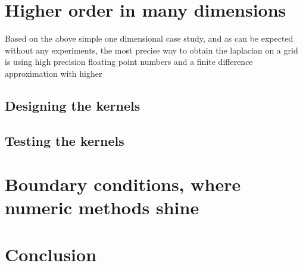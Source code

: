 \documentclass[pdftex,12pt,a4paper]{article}
\begin{document}
	\section{Higher order in many dimensions}
		Based on the above simple one dimensional case study, and as can be expected without any experiments, the most precise way to obtain the laplacian on a grid is using high precision floating point numbers and a finite difference approximation with higher 
	\subsection{Designing the kernels}
		
	\subsection{Testing the kernels}
		
	\section{Boundary conditions, where numeric methods shine}
		
	\section{Conclusion}
		
	
    
\end{document}
